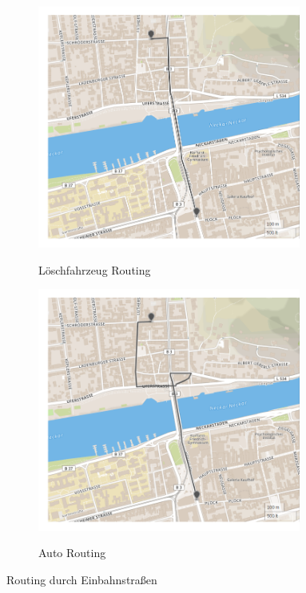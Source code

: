 \begin{figure}[htb]
\centering
\begin{subfigure}{0.49\textwidth}
\centering
\includegraphics[width = 0.95\textwidth]{../media/onewayeme.png} \\
\caption{Löschfahrzeug Routing}
\label{fig:onewayeme}
\end{subfigure}
\begin{subfigure}{0.49\textwidth}
\centering
\includegraphics[width = 0.95\textwidth]{../media/onewaycar.png} \\
\caption{Auto Routing}
\label{fig:onewaycar}
\end{subfigure}
\caption{Routing durch Einbahnstraßen}
\label{fig:oneway}
\end{figure}

